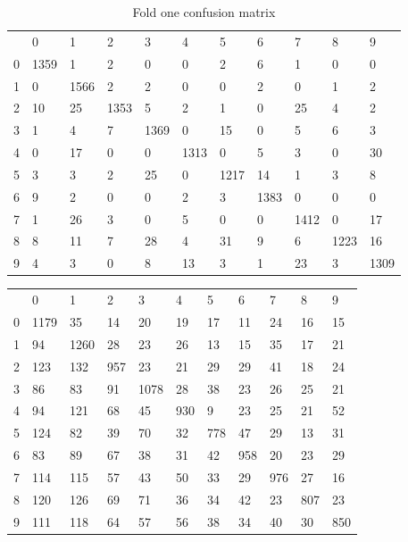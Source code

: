 \documentclass[12pt]{report}
\begin{document}
\begin{centering}
\begin{table}[h!]
\begin{tabular}{lllllllllll}

 & 0 & 1 & 2 & 3 & 4 & 5 & 6 & 7 & 8 & 9 \\
0 & 1359 & 1 & 2 & 0 & 0 & 2 & 6 & 1 & 0 & 0 \\
1 & 0 & 1566 & 2 & 2 & 0 & 0 & 2 & 0 & 1 & 2 \\
2 & 10 & 25 & 1353 & 5 & 2 & 1 & 0 & 25 & 4 & 2 \\
3 & 1 & 4 & 7 & 1369 & 0 & 15 & 0 & 5 & 6 & 3 \\
4 & 0 & 17 & 0 & 0 & 1313 & 0 & 5 & 3 & 0 & 30 \\
5 & 3 & 3 & 2 & 25 & 0 & 1217 & 14 & 1 & 3 & 8 \\
6 & 9 & 2 & 0 & 0 & 2 & 3 & 1383 & 0 & 0 & 0 \\
7 & 1 & 26 & 3 & 0 & 5 & 0 & 0 & 1412 & 0 & 17 \\
8 & 8 & 11 & 7 & 28 & 4 & 31 & 9 & 6 & 1223 & 16 \\
9 & 4 & 3 & 0 & 8 & 13 & 3 & 1 & 23 & 3 & 1309 \\

\end{tabular}
\caption{Fold one confusion matrix}
\end{table}

\begin{table}[h!]
\begin{tabular}{lllllllllll}

 & 0 & 1 & 2 & 3 & 4 & 5 & 6 & 7 & 8 & 9 \\
0 & 1179 & 35 & 14 & 20 & 19 & 17 & 11 & 24 & 16 & 15 \\
1 & 94 & 1260 & 28 & 23 & 26 & 13 & 15 & 35 & 17 & 21 \\
2 & 123 & 132 & 957 & 23 & 21 & 29 & 29 & 41 & 18 & 24 \\
3 & 86 & 83 & 91 & 1078 & 28 & 38 & 23 & 26 & 25 & 21 \\
4 & 94 & 121 & 68 & 45 & 930 & 9 & 23 & 25 & 21 & 52 \\
5 & 124 & 82 & 39 & 70 & 32 & 778 & 47 & 29 & 13 & 31 \\
6 & 83 & 89 & 67 & 38 & 31 & 42 & 958 & 20 & 23 & 29 \\
7 & 114 & 115 & 57 & 43 & 50 & 33 & 29 & 976 & 27 & 16 \\
8 & 120 & 126 & 69 & 71 & 36 & 34 & 42 & 23 & 807 & 23 \\
9 & 111 & 118 & 64 & 57 & 56 & 38 & 34 & 40 & 30 & 850 \\


\end{tabular}
\end{table}
\end{centering}
\end{document}
